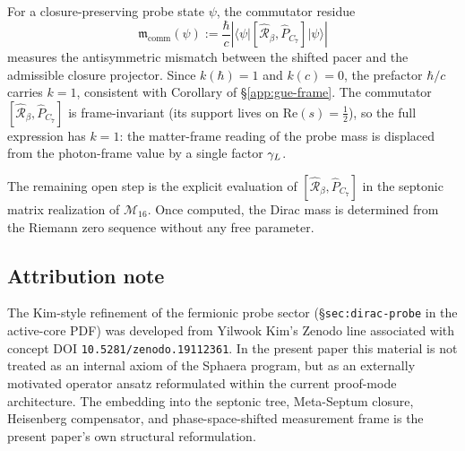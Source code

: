 \begin{definition}
For a closure-preserving probe state $\psi$, the commutator residue
\[
  \mathfrak{m}_{\mathrm{comm}}(\psi)
  := \frac{\hbar}{c}
     \left|
     \bigl\langle\psi\big|
     [\hat{\mathcal{R}}_\beta,\hat P_{C_7}]
     \big|\psi\bigr\rangle
     \right|
\]
measures the antisymmetric mismatch between the shifted pacer and the
admissible closure projector.
Since $k(\hbar)=1$ and $k(c)=0$, the prefactor $\hbar/c$ carries
$k=1$, consistent with Corollary of \S\ref{app:gue-frame}.
The commutator $[\hat{\mathcal{R}}_\beta,\hat P_{C_7}]$ is
frame-invariant (its support lives on $\mathrm{Re}(s)=\tfrac{1}{2}$),
so the full expression has $k=1$: the matter-frame reading of the probe
mass is displaced from the photon-frame value by a single factor $\gamma_L$.
\end{definition}

\begin{remark}
The remaining open step is the explicit evaluation of
$[\hat{\mathcal{R}}_\beta,\hat P_{C_7}]$ in the septonic matrix
realization of $\mathcal{M}_{16}$.
Once computed, the Dirac mass is determined from the Riemann zero
sequence without any free parameter.
\end{remark}

\subsection*{Attribution note}
\label{app:attribution}

The Kim-style refinement of the fermionic probe sector
(\S\texttt{sec:dirac-probe} in the active-core PDF) was developed from Yilwook Kim's Zenodo line
associated with concept DOI \texttt{10.5281/zenodo.19112361}.
In the present paper this material is not treated as an internal axiom
of the Sphaera program, but as an externally motivated operator ansatz
reformulated within the current proof-mode architecture.
The embedding into the septonic tree, Meta-Septum closure, Heisenberg
compensator, and phase-space-shifted measurement frame is the present
paper's own structural reformulation.






